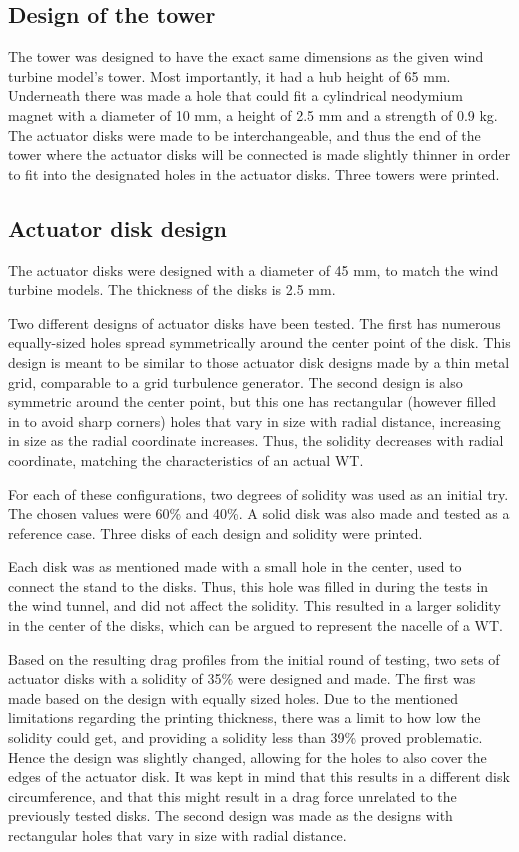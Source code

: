 \subsection{Design of the tower}
The tower was designed to have the exact same dimensions as the given wind turbine model's tower. Most importantly, it had a hub height of 65 mm. Underneath there was made a hole that could fit a cylindrical neodymium magnet with a diameter of 10 mm, a height of 2.5 mm and a strength of 0.9 kg. The actuator disks were made to be interchangeable, and thus the end of the tower where the actuator disks will be connected is made slightly thinner in order to fit into the designated holes in the actuator disks. Three towers were printed. 

\subsection{Actuator disk design}
The actuator disks were designed with a diameter of 45 mm, to match the wind turbine models. The thickness of the disks is 2.5 mm. 

Two different designs of actuator disks have been tested. The first has numerous equally-sized holes spread symmetrically around the center point of the disk. This design is meant to be similar to those actuator disk designs made by a thin metal grid, comparable to a grid turbulence generator. The second design is also symmetric around the center point, but this one has rectangular (however filled in to avoid sharp corners) holes that vary in size with radial distance, increasing in size as the radial coordinate increases. Thus, the solidity decreases with radial coordinate, matching the characteristics of an actual WT.  

For each of these configurations, two degrees of solidity was used as an initial try. The chosen values were 60\% and 40\%. A solid disk was also made and tested as a reference case. Three disks of each design and solidity were printed. 

Each disk was as mentioned made with a small hole in the center, used to connect the stand to the disks. Thus, this hole was filled in during the tests in the wind tunnel, and did not affect the solidity. This resulted in a larger solidity in the center of the disks, which can be argued to represent the nacelle of a WT.  

Based on the resulting drag profiles from the initial round of testing, two sets of actuator disks with a solidity of 35\% were designed and made. The first was made based on the design with equally sized holes. Due to the mentioned limitations regarding the printing thickness, there was a limit to how low the solidity could get, and providing a solidity less than 39\% proved problematic. Hence the design was slightly changed, allowing for the holes to also cover the edges of the actuator disk. It was kept in mind that this results in a different disk circumference, and that this might result in a drag force unrelated to the previously tested disks. The second design was made as the designs with rectangular holes that vary in size with radial distance.  

